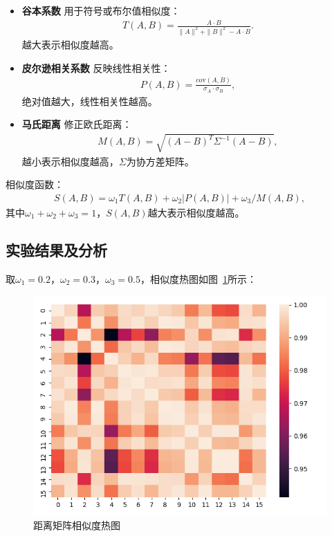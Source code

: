 \documentclass{whutmod}
\begin{document}
            \begin{itemize}
                \item \textbf{谷本系数}
                    用于符号或布尔值相似度：
                    \begin{gather}
                        T(A,B) = \frac{A \cdot B}{\|A\|^2 + \|B\|^2 - A \cdot B}.
                    \end{gather}
                    越大表示相似度越高。
                \item \textbf{皮尔逊相关系数}
                    反映线性相关性：
                    \begin{gather}
                        P(A,B) = \frac{\text{cov}(A,B)}{\sigma_A \cdot \sigma_B},
                    \end{gather}
                    绝对值越大，线性相关性越高。
                \item \textbf{马氏距离}
                    修正欧氏距离：
                    \begin{gather}
                        M(A,B) = \sqrt{(A-B)^T \Sigma^{-1} (A-B)},
                    \end{gather}
                    越小表示相似度越高，$\Sigma$为协方差矩阵。
            \end{itemize}

            相似度函数：
            \begin{gather}
                S(A,B) = \omega_1 T(A,B) + \omega_2 |P(A,B)| + \omega_3 / M(A,B),
            \end{gather}
            其中$\omega_1 + \omega_2 + \omega_3 = 1$，$S(A,B)$越大表示相似度越高。

        \subsection{实验结果及分析}
            取$\omega_1 = 0.2$，$\omega_2 = 0.3$，$\omega_3 = 0.5$，相似度热图如图~\ref{lsst}所示：

            \begin{figure}[H]
                \centering
                \includegraphics[width=.8\textwidth]{figures/retu.png}
                \caption{距离矩阵相似度热图}\label{lsst}
            \end{figure}
\end{document}
